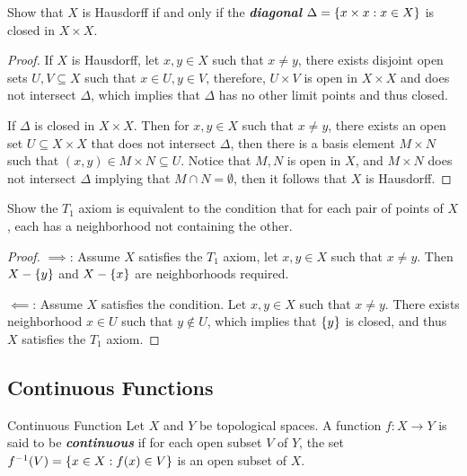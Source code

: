 \documentclass[12pt,a4paper]{article}
\begin{document}
    \begin{ex}
        Show that $X$ is Hausdorff if and only if the \textit{\textbf{diagonal}} $\Delta=\left\{x\times x: x\in X\right\}$ is closed in $X\times X$.
    \end{ex}
    \begin{proof}
        If $X$ is Hausdorff, let $x,y\in X$ such that $x\neq y$, there exists disjoint open sets $U,V\subseteq X$ such that $x\in U,y\in V$, therefore, $U\times V$ is open in $X\times X$ and does not intersect $\Delta$, which implies that $\Delta$ has no other limit points and thus closed.
        \vspace{1em}

        If $\Delta$ is closed in $X\times X$. Then for $x,y\in X$ such that $x\neq y$, there exists an open set $U\subseteq X\times X$ that does not intersect $\Delta$, then there is a basis element $M\times N$ such that $(x,y)\in M\times N\subseteq U$. Notice that $M, N$ is open in $X$, and $M\times N$ does not intersect $\Delta$ implying that $M\cap N=\emptyset$, then it follows that $X$ is Hausdorff.
    \end{proof}
    \hfill

    \begin{ex}
        Show the $T_1$ axiom is equivalent to the condition that for each pair of points of $X$, each has a neighborhood not containing the other.
    \end{ex}
    \begin{proof}
        $\implies\!$: Assume $X$ satisfies the $T_1$ axiom, let $x,y\in X$ such that $x\neq y$. Then $X-\left\{y\right\}$ and $X-\left\{x\right\}$ are neighborhoods required.
        \vspace{1em}

        $\impliedby\!$: Assume $X$ satisfies the condition. Let $x,y\in X$ such that $x\neq y$. There exists neighborhood $x\in U$ such that $y\notin U$, which implies that $\left\{y\right\}$ is closed, and thus $X$ satisfies the $T_1$ axiom.
    \end{proof}
    \hfill

    \subsection{Continuous Functions}
    \begin{defi}{Continuous Function}\label{2.7.1}
        Let $X$ and $Y$ be topological spaces. A function $f:X\to Y$ is said to be \textit{\textbf{continuous}} if for each open subset $V$ of $Y$, the set $f^{-1}(V)=\left\{x\in X:f(x)\in V\right\}$ is an open subset of $X$. 
    \end{defi}
    \hfill
\end{document}
